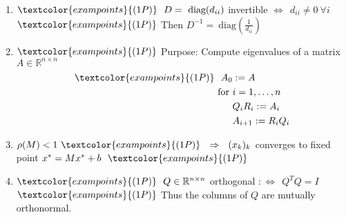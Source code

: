 {\color{solution}
\begin{enumerate}
	\item $\textcolor{exampoints}{(1P)}~~D=~\text{diag}(d_{ii})$ invertible $\Leftrightarrow~~d_{ii}\neq 0~\forall i$\\
	$\textcolor{exampoints}{(1P)}$ Then $D^{-1}=~\text{diag}(\frac{1}{d_{ii}})$
	
	\item 
	$\textcolor{exampoints}{(1P)}$ Purpose: Compute eigenvalues of a matrix $A\in\mathbb{R}^{n\times n}$
	\begin{align*}
	\textcolor{exampoints}{(1P)}~~A_0&:=A\\
	\text{for}~&i=1,\dots,n\\
	&Q_iR_i:=A_i\\
	&A_{i+1}:=R_iQ_i
	\end{align*}
	
	\item $\rho(M)<1~\textcolor{exampoints}{(1P)}~~\Rightarrow~~(x_k)_k$ converges to fixed point $x^*=Mx^*+b~~\textcolor{exampoints}{(1P)}$
	
	\item $\textcolor{exampoints}{(1P)}~~Q\in\mathbb{R}^{n\times n}$ orthogonal $:\Leftrightarrow~~Q^TQ=I$\\
	$\textcolor{exampoints}{(1P)}$ 
	Thus the columns of $Q$ are mutually orthonormal.
\end{enumerate}
}